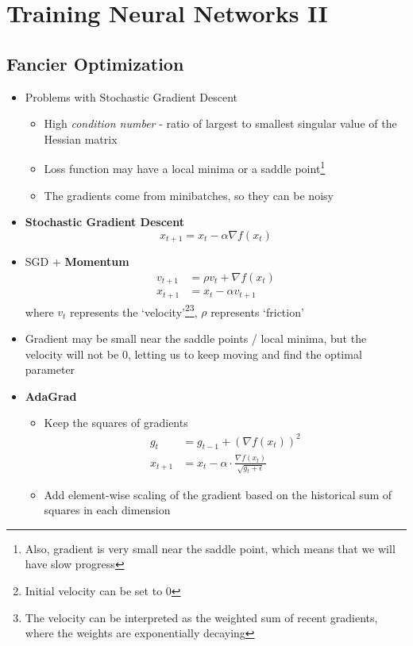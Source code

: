 \section{Training Neural Networks II}
\subsection{Fancier Optimization}
\begin{itemize}
	\item Problems with Stochastic Gradient Descent
	\begin{itemize}
		\item High \textit{condition number} - ratio of largest to smallest singular value of the Hessian matrix
		\item Loss function may have a local minima or a saddle point\footnote{Also, gradient is very small near the saddle point, which means that we will have slow progress}
		\item The gradients come from minibatches, so they can be noisy
	\end{itemize}
	\item \textbf{Stochastic Gradient Descent}
	$$x_{t+1} = x_t - \alpha \nabla f(x_t)$$
	\item SGD + \textbf{Momentum}
	$$\begin{aligned}
		v_{t + 1} &= \rho v_t + \nabla f(x_t) \\ x_{t+1} &= x_t - \alpha v_{t+1}
	\end{aligned}$$
	where $v_t$ represents the `velocity'\footnote{Initial velocity can be set to $0$}\footnote{The velocity can be interpreted as the weighted sum of recent gradients, where the weights are exponentially decaying}, $\rho$ represents `friction'
	\item Gradient may be small near the saddle points / local minima, but the velocity will not be $0$, letting us to keep moving and find the optimal parameter
	\item \textbf{AdaGrad}
	\begin{itemize}
		\item Keep the squares of gradients
		$$\begin{aligned}
		g_{t} &= g_{t-1} + \left(\nabla f(x_t)\right)^2\\
		x_{t + 1} &= x_t - \alpha\cdot \frac{\nabla f(x_t)}{\sqrt{g_t + \epsilon}}
		\end{aligned}$$
		\item Add element-wise scaling of the gradient based on the historical sum of squares in each dimension

\end{itemize}
\end{itemize}
